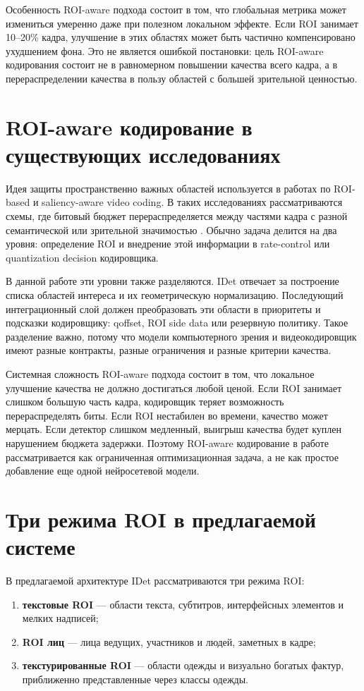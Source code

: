 \documentclass[12pt,a4paper,oneside,openany]{report}
\newcommand{\important}[1]{\textbf{#1}}
\begin{document}
Особенность ROI-aware подхода состоит в том, что глобальная метрика может измениться умеренно даже при полезном локальном эффекте. Если ROI занимает 10--20\% кадра, улучшение в этих областях может быть частично компенсировано ухудшением фона. Это не является ошибкой постановки: цель ROI-aware кодирования состоит не в равномерном повышении качества всего кадра, а в перераспределении качества в пользу областей с большей зрительной ценностью.

\section{ROI-aware кодирование в существующих исследованиях}

Идея защиты пространственно важных областей используется в работах по ROI-based и saliency-aware video coding. В таких исследованиях рассматриваются схемы, где битовый бюджет перераспределяется между частями кадра с разной семантической или зрительной значимостью \cite{roi_live_videos,roi_h264_transcoding,roi_hevc_rate_control,saliency_video}. Обычно задача делится на два уровня: определение ROI и внедрение этой информации в rate-control или quantization decision кодировщика.

В данной работе эти уровни также разделяются. IDet отвечает за построение списка областей интереса и их геометрическую нормализацию. Последующий интеграционный слой должен преобразовать эти области в приоритеты и подсказки кодировщику: qoffset, ROI side data или резервную политику. Такое разделение важно, потому что модели компьютерного зрения и видеокодировщик имеют разные контракты, разные ограничения и разные критерии качества.

Системная сложность ROI-aware подхода состоит в том, что локальное улучшение качества не должно достигаться любой ценой. Если ROI занимает слишком большую часть кадра, кодировщик теряет возможность перераспределять биты. Если ROI нестабилен во времени, качество может мерцать. Если детектор слишком медленный, выигрыш качества будет куплен нарушением бюджета задержки. Поэтому ROI-aware кодирование в работе рассматривается как ограниченная оптимизационная задача, а не как простое добавление еще одной нейросетевой модели.

\section{Три режима ROI в предлагаемой системе}

В предлагаемой архитектуре IDet рассматриваются три режима ROI:
\begin{enumerate}[label=\arabic*)]
\item \important{текстовые ROI} --- области текста, субтитров, интерфейсных элементов и мелких надписей;
\item \important{ROI лиц} --- лица ведущих, участников и людей, заметных в кадре;
\item \important{текстурированные ROI} --- области одежды и визуально богатых фактур, приближенно представленные через классы одежды.
\end{enumerate}
\end{document}
